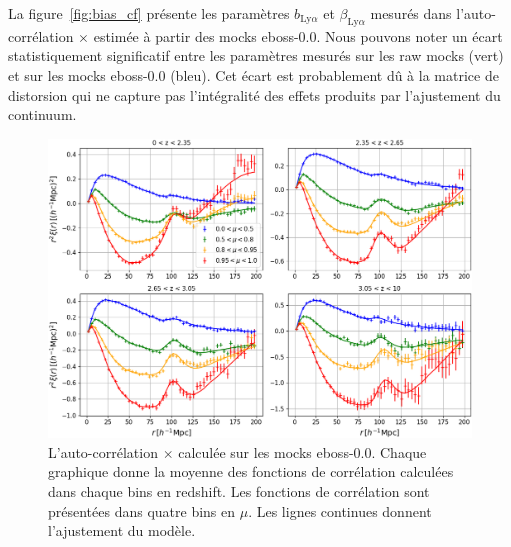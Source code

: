 La figure~\ref{fig:bias_cf} présente les paramètres $b_{\mathrm{Ly}\alpha}$ et $\beta_{\mathrm{Ly}\alpha}$ mesurés dans l'auto-corrélation \lya{}$\times$\lya{} estimée à partir des mocks eboss-0.0. Nous pouvons noter un écart statistiquement significatif entre les paramètres \lya{} mesurés sur les raw mocks (vert) et sur les mocks eboss-0.0 (bleu). Cet écart est probablement dû à la matrice de distorsion qui ne capture pas l'intégralité des effets produits par l'ajustement du continuum.

\begin{figure}
  \centering
  \includegraphics[scale=0.4]{cf_eboss00_4bins}
  \caption{L'auto-corrélation \lya{}$\times$\lya{} calculée sur les mocks eboss-0.0. Chaque graphique donne la moyenne des fonctions de corrélation calculées dans chaque bins en redshift. Les fonctions de corrélation sont présentées dans quatre bins en $\mu$. Les lignes continues donnent l'ajustement du modèle.}
  \label{fig:cf_eboss00_4bins}
\end{figure}

